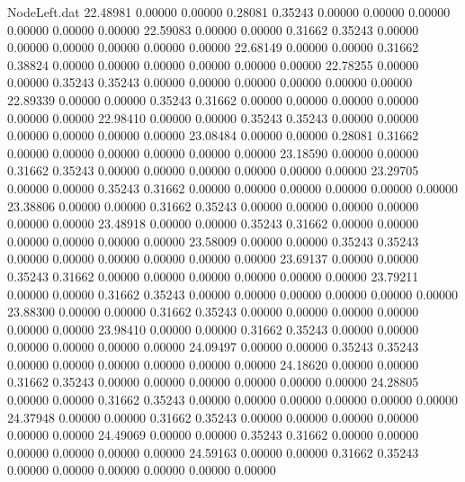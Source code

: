 \begin{filecontents}{NodeLeft.dat}
  22.48981    0.00000    0.00000     0.28081    0.35243    0.00000    0.00000    0.00000    0.00000    0.00000    0.00000
  22.59083    0.00000    0.00000     0.31662    0.35243    0.00000    0.00000    0.00000    0.00000    0.00000    0.00000
  22.68149    0.00000    0.00000     0.31662    0.38824    0.00000    0.00000    0.00000    0.00000    0.00000    0.00000
  22.78255    0.00000    0.00000     0.35243    0.35243    0.00000    0.00000    0.00000    0.00000    0.00000    0.00000
  22.89339    0.00000    0.00000     0.35243    0.31662    0.00000    0.00000    0.00000    0.00000    0.00000    0.00000
  22.98410    0.00000    0.00000     0.35243    0.35243    0.00000    0.00000    0.00000    0.00000    0.00000    0.00000
  23.08484    0.00000    0.00000     0.28081    0.31662    0.00000    0.00000    0.00000    0.00000    0.00000    0.00000
  23.18590    0.00000    0.00000     0.31662    0.35243    0.00000    0.00000    0.00000    0.00000    0.00000    0.00000
  23.29705    0.00000    0.00000     0.35243    0.31662    0.00000    0.00000    0.00000    0.00000    0.00000    0.00000
  23.38806    0.00000    0.00000     0.31662    0.35243    0.00000    0.00000    0.00000    0.00000    0.00000    0.00000
  23.48918    0.00000    0.00000     0.35243    0.31662    0.00000    0.00000    0.00000    0.00000    0.00000    0.00000
  23.58009    0.00000    0.00000     0.35243    0.35243    0.00000    0.00000    0.00000    0.00000    0.00000    0.00000
  23.69137    0.00000    0.00000     0.35243    0.31662    0.00000    0.00000    0.00000    0.00000    0.00000    0.00000
  23.79211    0.00000    0.00000     0.31662    0.35243    0.00000    0.00000    0.00000    0.00000    0.00000    0.00000
  23.88300    0.00000    0.00000     0.31662    0.35243    0.00000    0.00000    0.00000    0.00000    0.00000    0.00000
  23.98410    0.00000    0.00000     0.31662    0.35243    0.00000    0.00000    0.00000    0.00000    0.00000    0.00000
  24.09497    0.00000    0.00000     0.35243    0.35243    0.00000    0.00000    0.00000    0.00000    0.00000    0.00000
  24.18620    0.00000    0.00000     0.31662    0.35243    0.00000    0.00000    0.00000    0.00000    0.00000    0.00000
  24.28805    0.00000    0.00000     0.31662    0.35243    0.00000    0.00000    0.00000    0.00000    0.00000    0.00000
  24.37948    0.00000    0.00000     0.31662    0.35243    0.00000    0.00000    0.00000    0.00000    0.00000    0.00000
  24.49069    0.00000    0.00000     0.35243    0.31662    0.00000    0.00000    0.00000    0.00000    0.00000    0.00000
  24.59163    0.00000    0.00000     0.31662    0.35243    0.00000    0.00000    0.00000    0.00000    0.00000    0.00000

\end{filecontents}
